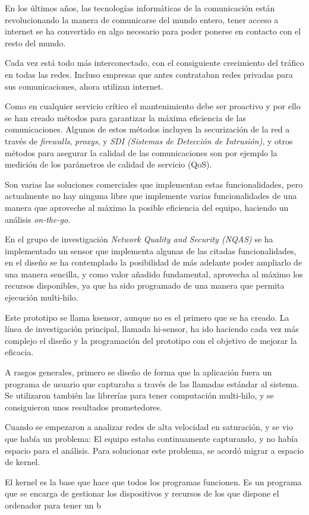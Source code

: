 
En los últimos años, las tecnologías informáticas de la comunicación están revolucionando la manera de comunicarse del mundo entero, tener acceso a internet se ha convertido en algo necesario para poder ponerse en contacto con el resto del mundo.

Cada vez está todo más interconectado, con el consiguiente crecimiento del tráfico en todas las redes. Incluso empresas que antes contrataban redes privadas para sus comunicaciones, ahora utilizan internet.

Como en cualquier servicio crítico el mantenimiento debe ser proactivo y por ello se han creado métodos para garantizar la máxima eficiencia de las comunicaciones. Algunos de estos métodos incluyen la securización de la red a través de \textit{firewalls}, \textit{proxys}, y \textit{SDI (Sistemas de Detección de Intrusión)}, y otros métodos para asegurar la calidad de las comunicaciones son por ejemplo la medición de los parámetros de calidad de servicio (QoS).

Son varias las soluciones comerciales que implementan estas funcionalidades, pero actualmente no hay ninguna libre que implemente varias funcionalidades de una manera que aproveche al máximo la posible eficiencia del equipo, haciendo un análisis \textit{on-the-go}.

En el grupo de investigación \textit{Network Quality and Security (NQAS)} se ha implementado un sensor que implementa algunas de las citadas funcionalidades, en el diseño se ha contemplado la posibilidad de más adelante poder ampliarlo de una manera sencilla, y como valor añadido fundamental, aprovecha al máximo los recursos disponibles, ya que ha sido programado de una manera que permita ejecución multi-hilo.

Este prototipo se llama ksensor, aunque no es el primero que se ha creado. La línea de investigación principal, llamada hi-sensor, ha ido haciendo cada vez más complejo el diseño y la programación del prototipo con el objetivo de mejorar la eficacia.

A rasgos generales, primero se diseño de forma que la aplicación fuera un programa de usuario que capturaba a través de las llamadas estándar al sistema. Se utilizaron también las librerías para tener computación multi-hilo, y se consiguieron unos resultados prometedores.

Cuando se empezaron a analizar redes de alta velocidad en saturación, y se vio que había un problema: El equipo estaba continuamente capturando, y no había espacio para el análisis. Para solucionar este problema, se acordó migrar a espacio de kernel.

El kernel es la base que hace que todos los programas funcionen. Es un programa que se encarga de gestionar los dispositivos y recursos de los que dispone el ordenador para tener un b